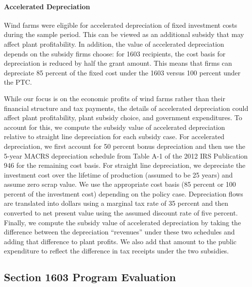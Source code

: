 \documentclass[12pt]{article}
\begin{document}
\paragraph*{Accelerated Depreciation}
Wind farms were eligible for accelerated depreciation of fixed investment costs during the sample period. This can be viewed as an additional subsidy that may affect plant profitability. In addition, the value of accelerated depreciation depends on the subsidy firms choose: for 1603 recipients, the cost basis for depreciation is reduced by half the grant amount. This means that firms can depreciate 85 percent of the fixed cost under the 1603 versus 100 percent under the PTC.

While our focus is on the economic profits of wind farms rather than their financial structure and tax payments, the details of accelerated depreciation could affect plant profitability, plant subsidy choice, and government expenditures. To account for this, we compute the subsidy value of accelerated depreciation relative to straight line depreciation for each subsidy case. For accelerated depreciation, we first account for 50 percent bonus depreciation and then use the 5-year MACRS depreciation schedule from Table A-1 of the 2012 IRS Publication 946 for the remaining cost basis. For straight line depreciation, we depreciate the investment cost over the lifetime of production (assumed to be 25 years) and assume zero scrap value. We use the appropriate cost basis (85 percent or 100 percent of the investment cost) depending on the policy case. Depreciation flows are translated into dollars using a marginal tax rate of 35 percent and then converted to net present value using the assumed discount rate of five percent. Finally, we compute the subsidy value of accelerated depreciation by taking the difference between the depreciation ``revenues'' under these two schedules and adding that difference to plant profits. We also add that amount to the public expenditure to reflect the difference in tax receipts under the two subsidies.

\subsection{Section 1603 Program Evaluation \label{Appendix:1603eval}}
\end{document}
